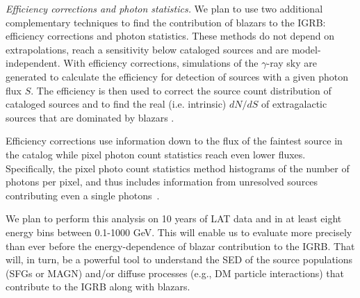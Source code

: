 \documentclass[12 pt]{article}
\begin{document}


{\it Efficiency corrections and photon statistics.}
We plan to use two additional complementary techniques to find the contribution of blazars to the IGRB: efficiency corrections and photon statistics.
These methods do not depend on extrapolations, reach a sensitivity below cataloged sources and are model-independent.
With efficiency corrections, simulations of the $\gamma$-ray sky are generated to calculate the efficiency for detection of sources with a given photon flux $S$. 
The efficiency is then used to correct the source count distribution of cataloged sources and to find the real (i.e. intrinsic) $dN/dS$ of extragalactic sources that are dominated by blazars \cite{TheFermi-LAT:2015ykq}.


Efficiency corrections use information down to the flux of the faintest source in the catalog while pixel photon count statistics reach even lower fluxes.
Specifically, the pixel photo count statistics method histograms of the number of photons per pixel, and thus includes information from unresolved sources contributing even a single photons~\cite{TheFermi-LAT:2015ykq}.



We plan to perform this analysis on 10 years of LAT data and in at least eight energy bins between 0.1-1000 GeV. This will enable us to evaluate more precisely than ever before the energy-dependence of blazar contribution to the IGRB.  That will, in turn, be a powerful tool to understand the SED of the source populations (SFGs or MAGN) and/or diffuse processes (e.g., DM particle interactions) that contribute to the IGRB along with blazars.
\end{document}
